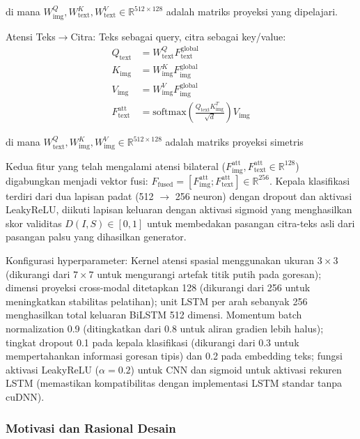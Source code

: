 \documentclass[journal]{IEEEtran}
\begin{document}
\noindent di mana $W_{\text{img}}^Q, W_{\text{text}}^K, W_{\text{text}}^V \in \mathbb{R}^{512 \times 128}$ adalah matriks proyeksi yang dipelajari.

Atensi Teks$\rightarrow$Citra: Teks sebagai query, citra sebagai key/value:
\begin{align}
Q_{\text{text}} &= W_{\text{text}}^Q F_{\text{text}}^{\text{global}} \nonumber\\
K_{\text{img}} &= W_{\text{img}}^K F_{\text{img}}^{\text{global}} \nonumber\\
V_{\text{img}} &= W_{\text{img}}^V F_{\text{img}}^{\text{global}} \label{eq:cross_text_proj}\\
F_{\text{text}}^{\text{att}} &= \text{softmax}\left(\frac{Q_{\text{text}} K_{\text{img}}^T}{\sqrt{d}}\right) V_{\text{img}} \label{eq:cross_text_att}
\end{align}

\noindent di mana $W_{\text{text}}^Q, W_{\text{img}}^K, W_{\text{img}}^V \in \mathbb{R}^{512 \times 128}$ adalah matriks proyeksi simetris

Kedua fitur yang telah mengalami atensi bilateral ($F_{\text{img}}^{\text{att}}, F_{\text{text}}^{\text{att}} \in \mathbb{R}^{128}$) digabungkan menjadi vektor fusi: $F_{\text{fused}} = [F_{\text{img}}^{\text{att}}; F_{\text{text}}^{\text{att}}] \in \mathbb{R}^{256}$. Kepala klasifikasi terdiri dari dua lapisan padat (512 $\rightarrow$ 256 neuron) dengan dropout dan aktivasi LeakyReLU, diikuti lapisan keluaran dengan aktivasi sigmoid yang menghasilkan skor validitas $D(I, S) \in [0, 1]$ untuk membedakan pasangan citra-teks asli dari pasangan palsu yang dihasilkan generator.

Konfigurasi hyperparameter: Kernel atensi spasial menggunakan ukuran $3 \times 3$ (dikurangi dari $7 \times 7$ untuk mengurangi artefak titik putih pada goresan); dimensi proyeksi cross-modal ditetapkan 128 (dikurangi dari 256 untuk meningkatkan stabilitas pelatihan); unit LSTM per arah sebanyak 256 menghasilkan total keluaran BiLSTM 512 dimensi. Momentum batch normalization 0.9 (ditingkatkan dari 0.8 untuk aliran gradien lebih halus); tingkat dropout 0.1 pada kepala klasifikasi (dikurangi dari 0.3 untuk mempertahankan informasi goresan tipis) dan 0.2 pada embedding teks; fungsi aktivasi LeakyReLU ($\alpha=0.2$) untuk CNN dan sigmoid untuk aktivasi rekuren LSTM (memastikan kompatibilitas dengan implementasi LSTM standar tanpa cuDNN).

\subsubsection{Motivasi dan Rasional Desain}
\end{document}
